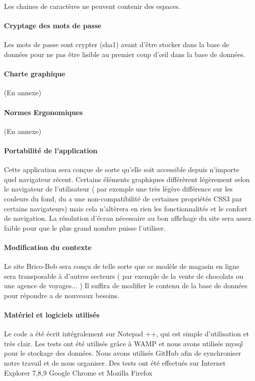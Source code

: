 Les chaines de caractères ne peuvent contenir des espaces.

\paragraph{Cryptage des mots de passe}

Les mots de passe sont crypter (sha1) avant d'être stocker dans la base de données pour ne pas être lisible au premier coup d'œil dans la base de données.

\paragraph{Charte graphique}

(En annexe)

\paragraph{Normes Ergonomiques}
	
(En annexe)

\paragraph{Portabilité de l'application}
	
Cette application sera conçue de sorte qu'elle soit accessible depuis n'importe quel navigateur récent. Certains éléments graphiques différèrent légèrement selon le navigateur de l'utilisateur ( par exemple une très légère différence sur les couleurs du fond, du a une non-compatibilité de certaines propriétés CSS3 par certains navigateurs) mais cela n'altèrera en rien les fonctionnalités et le confort de navigation.
La résolution d'écran nécessaire au bon affichage du site sera assez faible pour que le plus grand nombre puisse l'utiliser.

\paragraph{Modification du contexte}
	
Le site Brico-Bob sera conçu de telle sorte que ce modèle de magasin en ligne sera transposable à d'autres secteurs ( par exemple de la vente de chocolats ou  une agence de voyages... ) Il suffira de modifier le contenu de la base de données pour répondre a de nouveaux besoins.

\paragraph{Matériel et logiciels utilisés}
	
Le code a été écrit intégralement sur Notepad ++, qui est simple d'utilisation et très clair.
Les tests ont été utilisés grâce à WAMP et nous avons utilisés mysql pour le stockage des données.
Nous avons utilisés GitHub afin de synchroniser notre travail et de nous organiser.
Des tests ont été effectués sur Internet Explorer 7,8,9 Google Chrome et Mozilla Firefox
